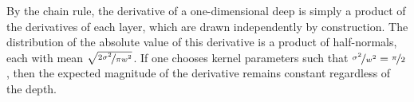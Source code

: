 \documentclass{article} %
\begin{document}
By the chain rule, the derivative of a one-dimensional deep \gp{} is simply a product of the derivatives of each layer, which are drawn independently by construction.
The distribution of the absolute value of this derivative is a product of half-normals, each with mean $\sqrt{\nicefrac{2 \sigma^2}{\pi w^2}}$.
%
%
If one chooses kernel parameters such that ${\nicefrac{\sigma^2}{w^2} = \nicefrac{\pi}{2}}$, then the expected magnitude of the derivative remains constant regardless of the depth.

\end{document}
